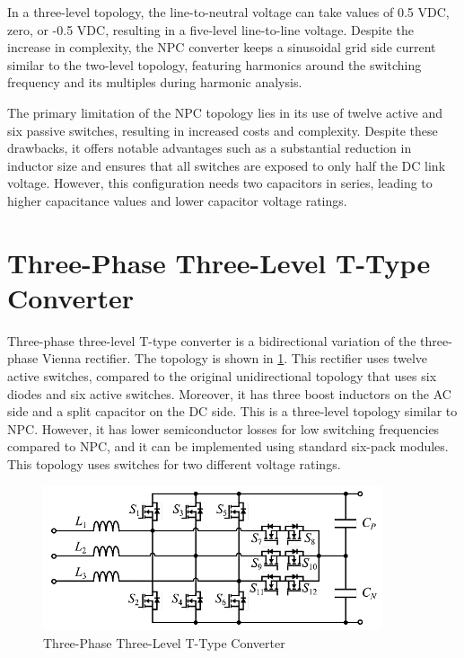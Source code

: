 \documentclass[12pt,a4paper]{book}
\begin{document}
In a three-level topology, the line-to-neutral voltage can take values of 0.5 VDC, zero, or -0.5 VDC, resulting in a five-level line-to-line voltage. Despite the increase in complexity, the NPC converter keeps a sinusoidal grid side current similar to the two-level topology, featuring harmonics around the switching frequency and its multiples during harmonic analysis.

The primary limitation of the NPC topology lies in its use of twelve active and six passive switches, resulting in increased costs and complexity. Despite these drawbacks, it offers notable advantages such as a substantial reduction in inductor size and ensures that all switches are exposed to only half the DC link voltage. However, this configuration needs two capacitors in series, leading to higher capacitance values and lower capacitor voltage ratings.

\section{Three-Phase Three-Level T-Type Converter}
Three-phase three-level T-type converter is a bidirectional variation of the three-phase Vienna rectifier. The topology is shown in \ref{fig:image7}. This rectifier uses twelve active switches, compared to the original unidirectional topology that uses six diodes and six active switches. Moreover, it has three boost inductors on the AC side and a split capacitor on the DC side. This is a three-level topology similar to NPC. However, it has lower semiconductor losses for low switching frequencies compared to NPC, and it can be implemented using standard six-pack modules. This topology uses switches for two different voltage ratings.
\begin{figure}[h]
  \centering
  \includegraphics[width=10cm]{image7.png}
  \caption{Three-Phase Three-Level T-Type Converter}
  \label{fig:image7}
\end{figure}
\end{document}
